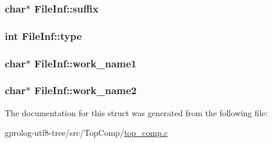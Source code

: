 \subsubsection[{\texorpdfstring{suffix}{suffix}}]{\setlength{\rightskip}{0pt plus 5cm}char$\ast$ File\+Inf\+::suffix}\hypertarget{structFileInf_a5ef754a773b84e5a9917436c6d8afe72}{}\label{structFileInf_a5ef754a773b84e5a9917436c6d8afe72}
\subsubsection[{\texorpdfstring{type}{type}}]{\setlength{\rightskip}{0pt plus 5cm}int File\+Inf\+::type}\hypertarget{structFileInf_a08c8fec214c452fa67b03a36ac58db5f}{}\label{structFileInf_a08c8fec214c452fa67b03a36ac58db5f}
\subsubsection[{\texorpdfstring{work\+\_\+name1}{work_name1}}]{\setlength{\rightskip}{0pt plus 5cm}char$\ast$ File\+Inf\+::work\+\_\+name1}\hypertarget{structFileInf_aab7c6e078d6f1ae349cf70872f35531d}{}\label{structFileInf_aab7c6e078d6f1ae349cf70872f35531d}
\subsubsection[{\texorpdfstring{work\+\_\+name2}{work_name2}}]{\setlength{\rightskip}{0pt plus 5cm}char$\ast$ File\+Inf\+::work\+\_\+name2}\hypertarget{structFileInf_a73706e94bc2b8654cfba501d8fce856e}{}\label{structFileInf_a73706e94bc2b8654cfba501d8fce856e}


The documentation for this struct was generated from the following file\+:\begin{DoxyCompactItemize}
\item 
gprolog-\/utf8-\/tree/src/\+Top\+Comp/\hyperlink{top__comp_8c}{top\+\_\+comp.\+c}\end{DoxyCompactItemize}

